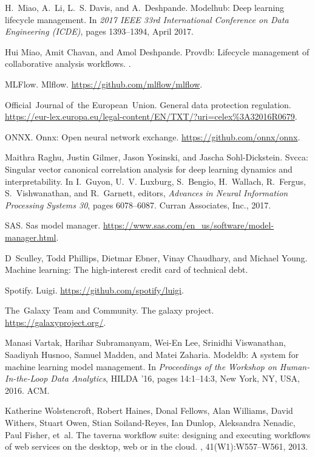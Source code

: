 \documentclass[11pt]{article}
\begin{document}
\begin{thebibliography}{10}
\begin{small}
H.~Miao, A.~Li, L.~S. Davis, and A.~Deshpande.
\newblock Modelhub: Deep learning lifecycle management.
\newblock In {\em 2017 IEEE 33rd International Conference on Data Engineering
  (ICDE)}, pages 1393--1394, April 2017.

Hui Miao, Amit Chavan, and Amol Deshpande.
\newblock Provdb: Lifecycle management of collaborative analysis workflows.
.

MLFlow.
\newblock Mlflow.
\newblock \url{https://github.com/mlflow/mlflow}.

Official~Journal of~the European~Union.
\newblock General data protection regulation.
\newblock
  \url{https://eur-lex.europa.eu/legal-content/EN/TXT/?uri=celex%3A32016R0679}.

ONNX.
\newblock Onnx: Open neural network exchange.
\newblock \url{https://github.com/onnx/onnx}.

Maithra Raghu, Justin Gilmer, Jason Yosinski, and Jascha Sohl-Dickstein.
\newblock Svcca: Singular vector canonical correlation analysis for deep
  learning dynamics and interpretability.
\newblock In I.~Guyon, U.~V. Luxburg, S.~Bengio, H.~Wallach, R.~Fergus,
  S.~Vishwanathan, and R.~Garnett, editors, {\em Advances in Neural Information
  Processing Systems 30}, pages 6078--6087. Curran Associates, Inc., 2017.

SAS.
\newblock Sas model manager.
\newblock \url{https://www.sas.com/en_us/software/model-manager.html}.

D~Sculley, Todd Phillips, Dietmar Ebner, Vinay Chaudhary, and Michael Young.
\newblock Machine learning: The high-interest credit card of technical debt.

Spotify.
\newblock Luigi.
\newblock \url{https://github.com/spotify/luigi}.

The~Galaxy Team and Community.
\newblock The galaxy project.
\newblock \url{https://galaxyproject.org/}.

Manasi Vartak, Harihar Subramanyam, Wei-En Lee, Srinidhi Viswanathan, Saadiyah
  Husnoo, Samuel Madden, and Matei Zaharia.
\newblock Modeldb: A system for machine learning model management.
\newblock In {\em Proceedings of the Workshop on Human-In-the-Loop Data
  Analytics}, HILDA '16, pages 14:1--14:3, New York, NY, USA, 2016. ACM.

Katherine Wolstencroft, Robert Haines, Donal Fellows, Alan Williams, David
  Withers, Stuart Owen, Stian Soiland-Reyes, Ian Dunlop, Aleksandra Nenadic,
  Paul Fisher, et~al.
\newblock The taverna workflow suite: designing and executing workflows of web
  services on the desktop, web or in the cloud.
, 41(W1):W557--W561, 2013.


\end{small}
\end{thebibliography}
\end{document}
